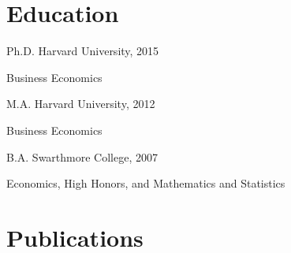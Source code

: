 \documentclass[letterpaper]{article}
\renewenvironment{itemize}{
  \begin{list}{}
    { \setlength{\itemsep}{5pt}
      \setlength{\parsep}{0pt}
      \setlength{\topsep}{0pt}
      \setlength{\leftmargin}{0em} } }{
  \end{list}}
\begin{document}
\section*{Education}

\begin{itemize}
\item Ph.D. Harvard University, 2015
  \begin{itemize}
  \item Business Economics
  \end{itemize}
\item M.A. Harvard University, 2012
  \begin{itemize}
  \item Business Economics
  \end{itemize}
\item B.A. Swarthmore College, 2007
  \begin{itemize}
  \item Economics, High Honors, and Mathematics and Statistics
  \end{itemize}
\end{itemize}

\section*{Publications}
\end{document}
